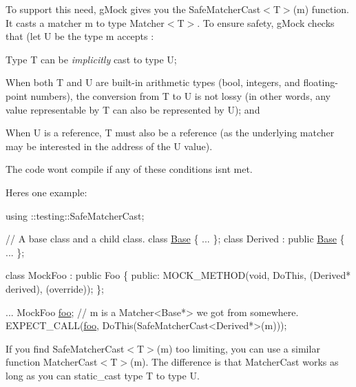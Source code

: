 To support this need, g\+Mock gives you the {\ttfamily Safe\+Matcher\+Cast$<$T$>$(m)} function. It casts a matcher {\ttfamily m} to type {\ttfamily Matcher$<$T$>$}. To ensure safety, g\+Mock checks that (let {\ttfamily U} be the type {\ttfamily m} accepts \+:


\begin{DoxyEnumerate}
\item Type {\ttfamily T} can be {\itshape implicitly} cast to type {\ttfamily U};
\item When both {\ttfamily T} and {\ttfamily U} are built-\/in arithmetic types ({\ttfamily bool}, integers, and floating-\/point numbers), the conversion from {\ttfamily T} to {\ttfamily U} is not lossy (in other words, any value representable by {\ttfamily T} can also be represented by {\ttfamily U}); and
\item When {\ttfamily U} is a reference, {\ttfamily T} must also be a reference (as the underlying matcher may be interested in the address of the {\ttfamily U} value).
\end{DoxyEnumerate}

The code won\textquotesingle{}t compile if any of these conditions isn\textquotesingle{}t met.

Here\textquotesingle{}s one example\+:


\begin{DoxyCode}
using ::testing::SafeMatcherCast;

\textcolor{comment}{// A base class and a child class.}
\textcolor{keyword}{class }\mbox{\hyperlink{classBase}{Base}} \{ ... \};
\textcolor{keyword}{class }Derived : \textcolor{keyword}{public} \mbox{\hyperlink{classBase}{Base}} \{ ... \};

\textcolor{keyword}{class }MockFoo : \textcolor{keyword}{public} Foo \{
 \textcolor{keyword}{public}:
  MOCK\_METHOD(\textcolor{keywordtype}{void}, DoThis, (Derived* derived), (\textcolor{keyword}{override}));
\};

...
  MockFoo \mbox{\hyperlink{namespacefoo}{foo}};
  \textcolor{comment}{// m is a Matcher<Base*> we got from somewhere.}
  EXPECT\_CALL(\mbox{\hyperlink{namespacefoo}{foo}}, DoThis(SafeMatcherCast<Derived*>(m)));
\end{DoxyCode}


If you find {\ttfamily Safe\+Matcher\+Cast$<$T$>$(m)} too limiting, you can use a similar function {\ttfamily Matcher\+Cast$<$T$>$(m)}. The difference is that {\ttfamily Matcher\+Cast} works as long as you can {\ttfamily static\+\_\+cast} type {\ttfamily T} to type {\ttfamily U}.

